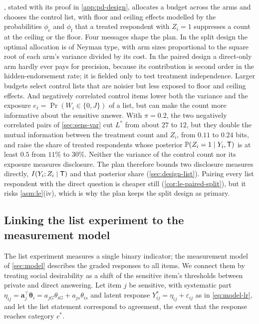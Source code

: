 , stated with its proof in \cref{app:pd-design}, allocates a budget across the arms and chooses the control list, with floor and ceiling effects \citep{blair2012} modelled by the probabilities $\phi_{\mathrm c}$ and $\phi_{\mathrm f}$ that a treated respondent with $Z_i=1$ suppresses a count at the ceiling or the floor. Four messages shape the plan. In the split design the optimal allocation is of Neyman type, with arm sizes proportional to the square root of each arm's variance divided by its cost. In the paired design a direct-only arm hardly ever pays for precision, because its contribution is second order in the hidden-endorsement rate; it is fielded only to test treatment independence. Larger budgets select control lists that are noisier but less exposed to floor and ceiling effects. And negatively correlated control items lower both the variance and the exposure $e_\ell=\Pr(W_i\in\{0,J\})$ of a list, but can make the count more informative about the sensitive answer. With $\pi=0.2$, the two negatively correlated pairs of \cref{sec:sens-var} cut $L^*$ from about $27$ to $12$, but they double the mutual information between the treatment count and $Z_i$, from $0.11$ to $0.24$ bits, and raise the share of treated respondents whose posterior $\mathbb{P}(Z_i=1\mid Y_i,\mathsf{T})$ is at least $0.5$ from $11\%$ to $30\%$. Neither the variance of the control count nor its exposure measures disclosure. The plan therefore bounds two disclosure measures directly, $I(Y_i;Z_i\mid\mathsf{T})$ and that posterior share (\cref{sec:design-list}). Pairing every list respondent with the direct question is cheaper still (\cref{cor:le-paired-split}), but it risks \cref{asm:le}(iv), which is why the plan keeps the split design as primary.

\subsection{Linking the list experiment to the measurement model}\label{sec:sens-irt}

The list experiment measures a single binary indicator; the measurement model of \cref{sec:model} describes the graded responses to all items. We connect them by treating social desirability as a shift of the sensitive item's thresholds between private and direct answering. Let item $j$ be sensitive, with systematic part $\eta_{ij}=\bm a_j^\top\bm\theta_i=a_{jG}\theta_{iG}+a_{js}\theta_{is}$ and latent response $Y^*_{ij}=\eta_{ij}+\varepsilon_{ij}$ as in \eqref{eq:model-lr}, and let the list statement correspond to agreement, the event that the response reaches category $c^*$.

